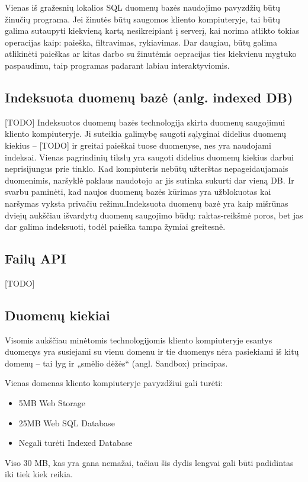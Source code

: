 \documentclass[12pt,a4paper,titlepage]{article}
\begin{document}
Vienas iš gražesnių lokalios SQL duomenų bazės naudojimo pavyzdžių būtų žinučių programa. Jei žinutės būtų saugomos kliento kompiuteryje, tai būtų galima sutaupyti kiekvieną kartą nesikreipiant į serverį, kai norima atlikto tokias operacijas kaip: paieška, filtravimas, rykiavimas. Dar daugiau, būtų galima atlikinėti paieškas ar kitas darbo su žinutėmis oepracijas ties kiekvienu mygtuko paspaudimu, taip programas padarant labiau interaktyviomis.

\subsection{Indeksuota duomenų bazė (anlg. indexed DB)}

[TODO]
Indeksuotos duomenų bazės technologija skirta duomenų saugojimui kliento kompiuteryje. Ji suteikia galimybę saugoti sąlyginai didelius duomenų kiekius – [TODO] ir greitai paieškai tuose duomenyse, nes yra naudojami indeksai. Vienas pagrindinių tikslų yra saugoti didelius duomenų kiekius darbui neprisijungus prie tinklo. Kad kompiuteris nebūtų užterštas nepageidaujamais duomenimis, naršyklė paklaus naudotojo ar jis sutinka sukurti dar vieną DB. Ir svarbu paminėti, kad naujos duomenų bazės kūrimas yra užblokuotas kai naršymas vyksta privačiu režimu.Indeksuota duomenų bazė yra kaip mišrūnas dviejų aukščiau išvardytų duomenų saugojimo būdų: raktas-reikšmė poros, bet jas dar galima indeksuoti, todėl paieška tampa žymiai greitesnė.

\subsection{Failų API}
[TODO]

\subsection{Duomenų kiekiai}

Visomis aukščiau minėtomis technologijomis kliento kompiuteryje esantys duomenys yra susiejami su vienu domenu ir tie duomenys nėra pasiekiami iš kitų domenų – tai lyg ir „smėlio dėžės“ (angl. Sandbox) principas.

Vienas domenas kliento kompiuteryje pavyzdžiui gali turėti:
\begin{itemize}
  \item 5MB Web Storage
  \item 25MB Web SQL Database
  \item Negali turėti Indexed Database
\end{itemize}
Viso 30 MB, kas yra gana nemažai, tačiau šis dydis lengvai gali būti padidintas iki tiek kiek reikia.
\end{document}
